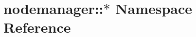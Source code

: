 \hypertarget{namespacenodemanager_1_1_5}{
\section{nodemanager::$\ast$ Namespace Reference}
\label{namespacenodemanager_1_1_5}
}


